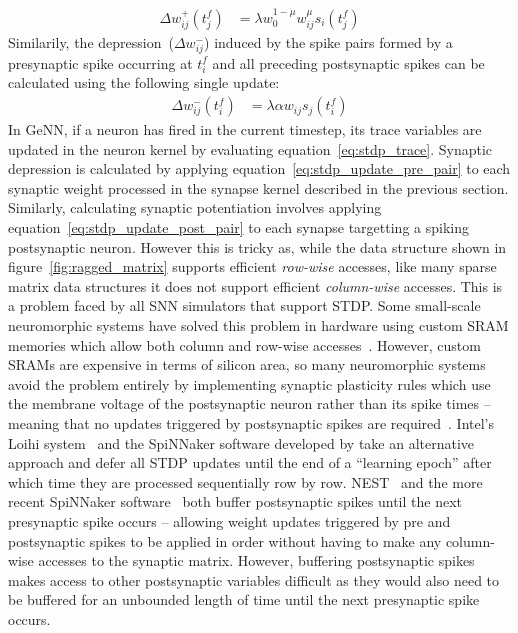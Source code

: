 \documentclass[utf8]{frontiersSCNS} %
\begin{document}
%
\begin{align}
  \Delta w_{ij}^{+}(t_{j}^{f}) & = \lambda w_{0}^{1-\mu} w_{ij}^{\mu} s_{i}(t_{j}^{f})\label{eq:stdp_update_post_pair}
\end{align}
%
Similarily, the depression~($\Delta w_{ij}^{-}$) induced by the spike pairs formed by a presynaptic spike occurring at $t_{i}^{f}$ and all preceding postsynaptic spikes can be calculated using the following single update:
\begin{align}
    \Delta w_{ij}^{-}(t_{i}^{f}) & = \lambda \alpha w_{ij} s_{j}(t_{i}^{f})\label{eq:stdp_update_pre_pair}
\end{align}
%
In GeNN, if a neuron has fired in the current timestep, its trace variables are updated in the neuron kernel by evaluating equation~\ref{eq:stdp_trace}.
Synaptic depression is calculated by applying equation~\ref{eq:stdp_update_pre_pair} to each synaptic weight processed in the synapse kernel described in the previous section.
Similarly, calculating synaptic potentiation involves applying equation~\ref{eq:stdp_update_post_pair} to each synapse targetting a spiking postsynaptic neuron.
However this is tricky as, while the data structure shown in figure~\ref{fig:ragged_matrix} supports efficient \textit{row-wise} accesses, like many sparse matrix data structures it does not support efficient \textit{column-wise} accesses.
This is a problem faced by all SNN simulators that support STDP.
Some small-scale neuromorphic systems have solved this problem in hardware using custom SRAM memories which allow both column and row-wise accesses~\citep{Seo2011}.
However, custom SRAMs are expensive in terms of silicon area, so many neuromorphic systems avoid the problem entirely by implementing synaptic plasticity rules which use the membrane voltage of the postsynaptic neuron rather than its spike times -- meaning that no updates triggered by postsynaptic spikes are required~\citep{Frenkel2018,Qiao2015}.
Intel's Loihi system~\citep{Davies2018} and the SpiNNaker software developed by \citet{Galluppi2014a} take an alternative approach and defer all STDP updates until the end of a ``learning epoch'' after which time they are processed sequentially row by row.
NEST~\citep{Morrison2007} and the more recent SpiNNaker software~\citep{Knight2016} both buffer postsynaptic spikes until the next presynaptic spike occurs -- allowing weight updates triggered by pre and postsynaptic spikes to be applied in order without having to make any column-wise accesses to the synaptic matrix. 
However, buffering postsynaptic spikes makes access to other postsynaptic variables difficult as they would also need to be buffered for an unbounded length of time until the next presynaptic spike occurs.
\end{document}
